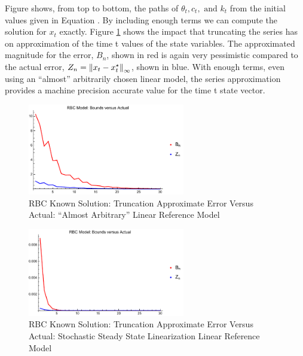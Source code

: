 \documentclass[12pt]{article}
\begin{document}
Figure  shows, from top to bottom, the paths of $\theta_t, c_t, \text{ and } k_t$ from the initial values given in Equation . 
By including enough terms we can compute the solution for $x_t$ 
exactly.
Figure \ref{rbcTrunc} shows the impact that truncating the series has 
on approximation of the time t values of the state variables.   The approximated magnitude for the error, $B_n$, shown in red 
 is again very pessimistic compared to the actual error, $Z_n=\left\lVert x_t-x_t^\star\right\rVert_\infty$, shown in blue.
With enough terms, even using an ``almost'' arbitrarily chosen linear model,  the series approximation provides a machine precision accurate value for the time t state vector. 

\begin{figure}
  \centering
\includegraphics[width=2.7in]{simpArbBoundsVActual.pdf}  
  \caption{RBC Known Solution: Truncation Approximate Error  Versus Actual: ``Almost Arbitrary'' Linear Reference Model}
  \label{rbcTrunc}
\end{figure}
\begin{figure}
  \centering
\includegraphics[width=2.7in]{simpBoundsVActual.pdf}  
  \caption{RBC Known Solution: Truncation Approximate Error Versus Actual: Stochastic Steady State Linearization Linear Reference Model}
  \label{rbcTruncSimp}
\end{figure}
\end{document}
